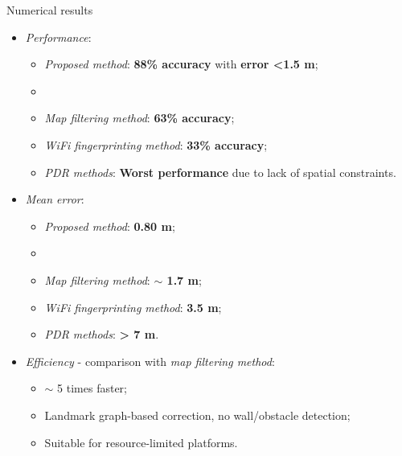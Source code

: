 \begin{frame}{Numerical results}
    \begin{itemize}
        \item \textit{Performance}:
            \begin{itemize}
                \item \textit{Proposed method}: \textbf{88\% accuracy} with \textbf{error <1.5 m};
                \item[]
                \item \textit{Map filtering method}: \textbf{63\% accuracy};
                \item \textit{WiFi fingerprinting method}: \textbf{33\% accuracy};
                \item \textit{PDR methods}: \textbf{Worst performance} due to lack of spatial constraints.
            \end{itemize}
        \item \textit{Mean error}:
            \begin{itemize}
                \item \textit{Proposed method}: \textbf{0.80 m};
                \item[]
                \item \textit{Map filtering method}: \textbf{$\sim$ 1.7 m};
                \item \textit{WiFi fingerprinting method}: \textbf{3.5 m};
                \item \textit{PDR methods}: \textbf{> 7 m}.
            \end{itemize}
        \item \textit{Efficiency} - comparison with \textit{map filtering method}:
            \begin{itemize}
                \item $\sim$ 5 times faster;
                \item Landmark graph-based correction, no wall/obstacle detection;
                \item Suitable for resource-limited platforms.
            \end{itemize}
    \end{itemize}
\end{frame}